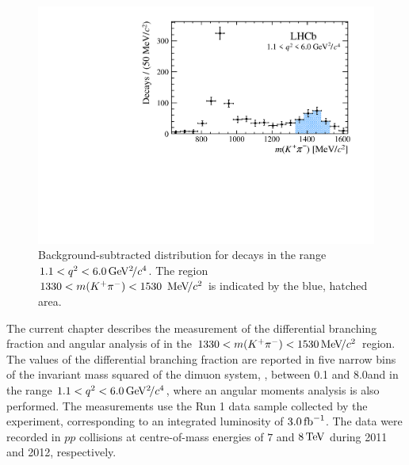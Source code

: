 \begin{figure}[!tb]
 \centering
 \includegraphics[width=0.7\linewidth]{figs/kpimm/introduction/full-mkpi.pdf}
 \caption{Background-subtracted \mkpi distribution for \BdToKpimm decays in the range $1.1<{q^2}<6.0{\mathrm{\,Ge\kern -0.1em V^2\!/}c^4}$. The region $1330<m({{K}^+}{{\pi}^-})<1530~{\mathrm{\,Me\kern -0.1em V\!/}c^2}$ is indicated by the blue, hatched area.}
\label{fig:full-mkpi}
\end{figure}

The current chapter describes the measurement of the differential branching fraction and angular analysis of \BdToKpimm in the $1330<m({{K}^+}{{\pi}^-})<1530{\mathrm{\,Me\kern -0.1em V\!/}c^2}$ region. The values of the differential branching fraction are reported in five narrow bins of the invariant mass squared of the dimuon system, \qsq, between 0.1 and 8.0\gevgevcccc and in the range $1.1<{q^2}<6.0{\mathrm{\,Ge\kern -0.1em V^2\!/}c^4}$,  where an angular moments analysis is also performed. The measurements use the Run 1 data sample collected by the \lhcb experiment, corresponding to an integrated luminosity of $3.0\mbox{\,fb}^{-1}$. The data were recorded in $pp$ collisions at centre-of-mass energies of $7$ and $8\mathrm{\,Te\kern -0.1em V}$ during 2011 and 2012, respectively. 